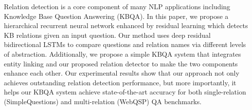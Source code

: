 Relation detection is a core component of many NLP applications including Knowledge Base Question Answering (KBQA). In this paper, we propose a hierarchical recurrent neural network enhanced by residual learning which detects KB relations given an input question. Our method uses deep residual bidirectional LSTMs to compare questions and relation names via different levels of abstraction. Additionally, we propose a simple KBQA system that integrates entity linking and our proposed relation detector to make the two components enhance each other. Our experimental results show that our approach not only achieves outstanding relation detection performance, but more importantly, it helps our KBQA system achieve state-of-the-art accuracy for both single-relation (SimpleQuestions) and multi-relation (WebQSP) QA benchmarks.
